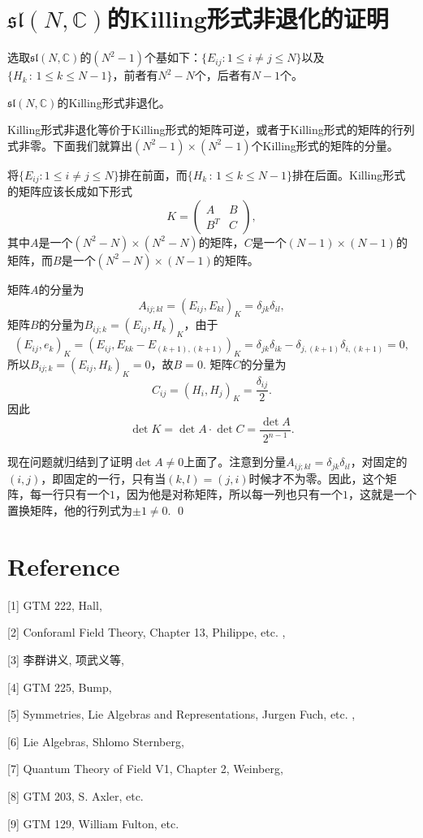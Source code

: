 \documentclass[9pt]{extarticle}
\newcommand{\cc}{\mathbb{C}}
\begin{document}
\clearpage
\section{$\mathfrak{sl}(N,\cc)$的Killing形式非退化的证明}

选取$\mathfrak{sl}(N,\cc)$的$(N^2-1)$个基如下：$\{E_{ij}:1\leq i\neq j \leq N\}$以及$\{H_k\,:\, 1\leq k \leq N-1\}$，前者有$N^2-N$个，后者有$N-1$个。

\pro $\mathfrak{sl}(N,\cc)$的Killing形式非退化。

\proof Killing形式非退化等价于Killing形式的矩阵可逆，或者于Killing形式的矩阵的行列式非零。下面我们就算出$(N^2-1)\times (N^2-1)$个Killing形式的矩阵的分量。

将$\{E_{ij}:1\leq i\neq j \leq N\}$排在前面，而$\{H_k\,:\, 1\leq k \leq N-1\}$排在后面。Killing形式的矩阵应该长成如下形式
\[
K=\begin{pmatrix}
A&B\\
B^T&C
\end{pmatrix},
\]
其中$A$是一个$(N^2-N)\times (N^2-N)$的矩阵，$C$是一个$(N-1)\times (N-1)$的矩阵，而$B$是一个$(N^2-N)\times (N-1)$的矩阵。

矩阵$A$的分量为
\[
	A_{ij;kl}=(E_{ij},E_{kl})_K=\delta_{jk}\delta_{il},
\]
矩阵$B$的分量为$B_{ij;k}=(E_{ij},H_k)_K$，由于
\[
	(E_{ij},e_k)_K=(E_{ij},E_{kk}-E_{(k+1),(k+1)})_K=\delta_{jk}\delta_{ik}-\delta_{j,(k+1)}\delta_{i,(k+1)}=0,
\]
所以$B_{ij;k}=(E_{ij},H_k)_K=0$，故$B=0$. 矩阵$C$的分量为
\[
	C_{ij}=(H_i,H_j)_K=\frac{\delta_{ij}}{2}.
\]
因此
\[
\det K =\det A \cdot \det C = \frac{\det A}{2^{n-1}}.
\]

现在问题就归结到了证明$\det A\neq 0$上面了。注意到分量$A_{ij;kl}=\delta_{jk}\delta_{il}$，对固定的$(i,j)$，即固定的一行，只有当$(k,l)=(j,i)$时候才不为零。因此，这个矩阵，每一行只有一个$1$，因为他是对称矩阵，所以每一列也只有一个$1$，这就是一个置换矩阵，他的行列式为$\pm 1\neq 0$. \qed
\clearpage

\section*{Reference}

[1] GTM 222, Hall,

[2] Conforaml Field Theory, Chapter 13, Philippe, etc. ,

[3] 李群讲义, 项武义等, 

[4] GTM 225, Bump,

[5] Symmetries, Lie Algebras and Representations, Jurgen Fuch, etc. ,

[6] Lie Algebras, Shlomo Sternberg,

[7] Quantum Theory of Field V1, Chapter 2, Weinberg,

[8] GTM 203, S. Axler, etc.

[9] GTM 129, William Fulton, etc.
\end{document}
